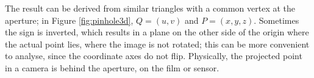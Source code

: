The result can be derived from similar triangles with a common vertex at the aperture; in Figure \ref{fig:pinhole3d}, $Q = (u, v)$ and $P = (x, y, z)$.
Sometimes the sign is inverted, which results in a plane on the other side of the origin where the actual point lies, where the image is not rotated; this can be more convenient to analyse, since the coordinate axes do not flip.
Physically, the projected point in a camera is behind the aperture, on the film or sensor.

%




